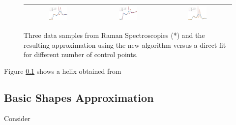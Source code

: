  
 \begin{figure}
  \begin{tabular}{ccc}
  \hline
{\includegraphics[width=0.29\textwidth]{noise1}}
&{\includegraphics[width=0.29\textwidth]{noise2}}
&{\includegraphics[width=0.29\textwidth]{noise3}}\\
\hline
  \end{tabular}
\caption{\label{fig:noise_DLS_vs_ECILS} Three data samples from Raman Spectroscopies (*) 
and the resulting approximation using the new algorithm versus a direct fit for different number of control points. 
}
 \end{figure}



 
 Figure \ref{} shows a helix obtained from \subsection{Basic Shapes Approximation}
 Consider
 
 



   
